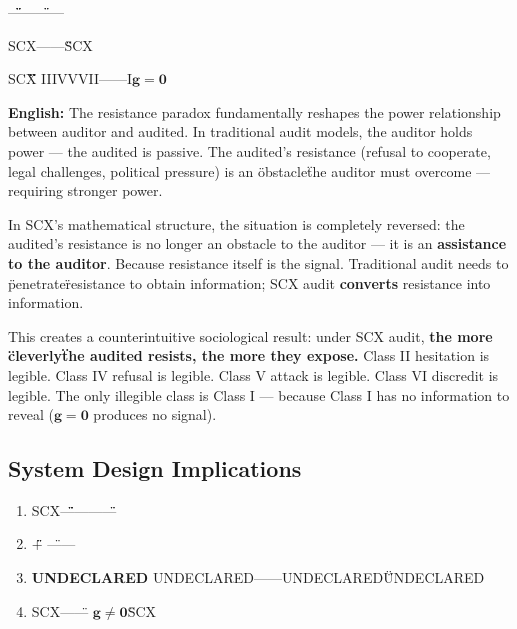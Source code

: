 \documentclass[12pt,a4paper]{article}
\theoremstyle{remark}
\newcommand{\g}{\mathbf{g}}
\begin{document}
\noindent
\textbf{} \"\"\"\"——\"\"——

SCX——\textbf{}\"\"SCX\textbf{}

SCX\textbf{\"\"} IIIVVVII——I$ \g = \mathbf{0} $ 

\vspace{6pt}
\noindent
\textbf{English:} The resistance paradox fundamentally reshapes the power relationship between auditor and audited. In traditional audit models, the auditor holds power — the audited is passive. The audited's resistance (refusal to cooperate, legal challenges, political pressure) is an \"obstacle\" the auditor must overcome — requiring stronger power.

In SCX's mathematical structure, the situation is completely reversed: the audited's resistance is no longer an obstacle to the auditor — it is an \textbf{assistance to the auditor}. Because resistance itself is the signal. Traditional audit needs to \"penetrate\" resistance to obtain information; SCX audit \textbf{converts} resistance into information.

This creates a counterintuitive sociological result: under SCX audit, \textbf{the more \"cleverly\" the audited resists, the more they expose.} Class II hesitation is legible. Class IV refusal is legible. Class V attack is legible. Class VI discredit is legible. The only illegible class is Class I — because Class I has no information to reveal ($ \g = \mathbf{0} $ produces no signal).

\subsection{}
\subsection{System Design Implications}

\begin{enumerate}[label=(\arabic*)]
    \item \textbf{} SCX\"\"\"\"————\"\"
    
    \item \textbf{} \"\"\" + \"——
    
    \item \textbf{UNDECLARED} UNDECLARED\textbf{}——UNDECLARED\"\"UNDECLARED
    
    \item \textbf{} SCX——\" $ \g \neq \mathbf{0} $\"SCX
\end{enumerate}
\end{document}
